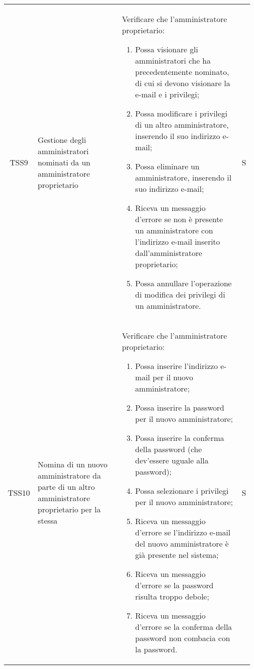 {\begin{longtable}{ c  C{2.5cm}  C{10cm} C{1cm}}
TSS9 & Gestione degli amministratori nominati da un amministratore proprietario & 
Verificare che l'amministratore proprietario:
\begin{enumerate}
    \item Possa visionare gli amministratori che ha precedentemente nominato, di cui si devono visionare la e-mail e i privilegi;
    \item Possa modificare i privilegi di un altro amministratore, inserendo il suo indirizzo e-mail;
    \item Possa eliminare un amministratore, inserendo il suo indirizzo e-mail; 
    \item Riceva un messaggio d'errore se non è presente un amministratore con l'indirizzo e-mail inserito dall'amministratore proprietario;
    \item Possa annullare l'operazione di modifica dei privilegi di un amministratore.
\end{enumerate} & S \\

TSS10 & Nomina di un nuovo amministratore da parte di un altro amministratore proprietario per la stessa  & 
Verificare che l'amministratore proprietario:
\begin{enumerate}
    \item Possa inserire l'indirizzo e-mail per il nuovo amministratore;
    \item Possa inserire la password per il nuovo amministratore;
    \item Possa inserire la conferma della password (che dev'essere uguale alla password);
    \item Possa selezionare i privilegi per il nuovo amministratore;
    \item Riceva un messaggio d'errore se l'indirizzo e-mail del nuovo amministratore è già presente nel sistema;
    \item Riceva un messaggio d'errore se la password risulta troppo debole;
    \item Riceva un messaggio d'errore se la conferma della password non combacia con la password.
\end{enumerate} & S \\
\end{longtable}
}